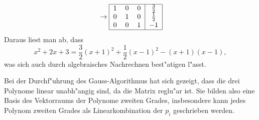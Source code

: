 \begin{loesung}
\begin{teilaufgaben}
\begin{align*}
\begin{tabular}{|ccc|c|}
\hline
\end{tabular}
\rightarrow
\begin{tabular}{|ccc|c|}
\hline
1&0&0&$\frac32$\\
0&1&0&$\frac12$\\
0&0&1&$-1$\\
\hline
\end{tabular}
\end{align*}
Daraus liest man ab, dass
\[
x^2+2x+3=\frac32(x+1)^2+\frac12(x-1)^2-(x+1)(x-1),
\]
was sich auch durch algebraisches Nachrechnen best"atigen l"asst.
\item
Bei der Durchf"uhrung des Gauss-Algorithmus hat sich gezeigt, dass
die drei Polynome linear unabh"angig sind, da die Matrix reglu"ar
ist. Sie bilden also eine Basis des Vektorraums der Polynome zweiten
Grades, insbesondere kann jedes Polynom zweiten Grades als Linearkombination
der $p_i$ geschrieben werden.
\qedhere
\end{teilaufgaben}
\end{loesung}

